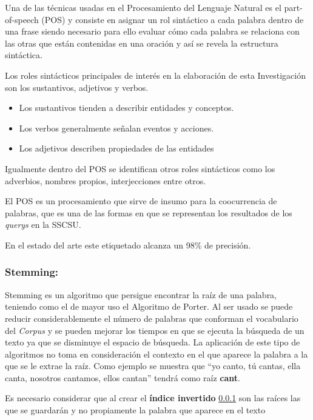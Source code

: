 \documentclass[
  10,
  openany]{book}
\begin{document}
Una de las técnicas usadas en el Procesamiento del Lenguaje Natural es el part-of-speech (POS) y consiste en asignar un rol sintáctico a cada palabra dentro de una frase \citep{eisenstein2019} siendo necesario para ello evaluar cómo cada palabra se relaciona con las otras que están contenidas en una oración y así se revela la estructura sintáctica.

Los roles sintácticos principales de interés en la elaboración de esta Investigación son los sustantivos, adjetivos y verbos.

\begin{itemize}
\item
  Los sustantivos tienden a describir entidades y conceptos.
\item
  Los verbos generalmente señalan eventos y acciones.
\item
  Los adjetivos describen propiedades de las entidades
\end{itemize}

Igualmente dentro del POS se identifican otros roles sintácticos como los adverbios, nombres propios, interjecciones entre otros.

El POS es un procesamiento que sirve de insumo para la coocurrencia de palabras, que es una de las formas en que se representan los resultados de los \emph{querys} en la SSCSU.

En el estado del arte este etiquetado alcanza un 98\% de precisión.

\hypertarget{steaming}{%
\subsubsection{Stemming:}\label{steaming}}

Stemming es un algoritmo que persigue encontrar la raíz de una palabra, teniendo como el de mayor uso el Algoritmo de Porter. Al ser usado se puede reducir considerablemente el número de palabras que conforman el vocabulario del \emph{Corpus} y se pueden mejorar los tiempos en que se ejecuta la búsqueda de un texto ya que se disminuye el espacio de búsqueda. La aplicación de este tipo de algoritmos no toma en consideración el contexto en el que aparece la palabra a la que se le extrae la raíz. Como ejemplo se muestra que ``yo canto, tú cantas, ella canta, nosotros cantamos, ellos cantan'' tendrá como raíz \textbf{cant}.

Es necesario considerar que al crear el \textbf{índice invertido} \ref{steaming} son las raíces las que se guardarán y no propiamente la palabra que aparece en el texto
\end{document}
